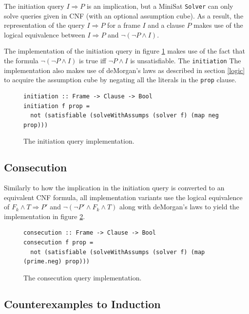\documentclass[12pt,a4paper,twoside,openright]{report}
\begin{document}
{The initiation query $I \Rightarrow P$ is an implication, but a MiniSat \verb,Solver, can only
solve queries given in CNF (with an optional assumption cube). As a result, the representation
of the query $I \Rightarrow P$ for a frame $I$ and a clause $P$ makes use of the logical equivalence between
$I \Rightarrow P$ and $\neg (\neg P \wedge I)$.

The implementation of the initiation query in figure \ref{impl:initiation} makes use of
the fact that the formula $\neg (\neg P \wedge I)$ is true iff $\neg P \wedge I$ is unsatisfiable.
The \verb,initiation,
The implementation also makes use of deMorgan's laws as described in section
\ref{logic} to acquire the assumption cube by negating all the literals in the \verb,prop, clause.

\begin{figure}[!Ht]
\begin{lstlisting}
initiation :: Frame -> Clause -> Bool
initiation f prop =
  not (satisfiable (solveWithAssumps (solver f) (map neg prop)))
\end{lstlisting}
\caption{The initiation query implementation.}
\label{impl:initiation}
\end{figure}

\subsection{Consecution}

Similarly to how the implication in the initiation query is converted to an equivalent CNF
formula, all implementation variants use the logical equivalence of
$F_k \wedge T \Rightarrow P'$ and $\neg (\neg P' \wedge F_k \wedge T)$ along with deMorgan's
laws to yield the implementation in figure \ref{impl:consecution}.

\begin{figure}[!Ht]
\begin{lstlisting}
consecution :: Frame -> Clause -> Bool
consecution f prop =
  not (satisfiable (solveWithAssumps (solver f) (map (prime.neg) prop)))
\end{lstlisting}
\caption{The consecution query implementation.}
\label{impl:consecution}
\end{figure}

\subsection{Counterexamples to Induction}

}
\end{document}
